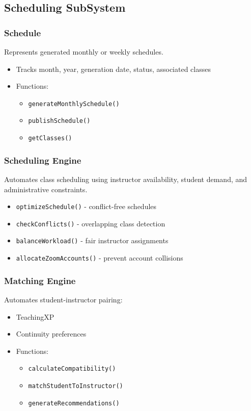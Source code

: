 \subsection{Scheduling SubSystem}

\subsubsection{Schedule}
Represents generated monthly or weekly schedules.
\begin{itemize}
    \item Tracks month, year, generation date, status, associated classes
    \item Functions:
    \begin{itemize}
        \item \texttt{generateMonthlySchedule()}
        \item \texttt{publishSchedule()}
        \item \texttt{getClasses()}
    \end{itemize}
\end{itemize}

\subsubsection{Scheduling Engine}
Automates class scheduling using instructor availability, student demand, and administrative constraints.
\begin{itemize}
    \item \texttt{optimizeSchedule()} - conflict-free schedules
    \item \texttt{checkConflicts()} - overlapping class detection
    \item \texttt{balanceWorkload()} - fair instructor assignments
    \item \texttt{allocateZoomAccounts()} - prevent account collisions
\end{itemize}

\subsubsection{Matching Engine}
Automates student-instructor pairing:
\begin{itemize}
    \item TeachingXP
    \item Continuity preferences
    \item Functions:
    \begin{itemize}
        \item \texttt{calculateCompatibility()}
        \item \texttt{matchStudentToInstructor()}
        \item \texttt{generateRecommendations()}
    \end{itemize}
\end{itemize}

